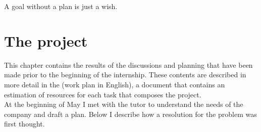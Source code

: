 \begin{savequote}[75mm]
	A goal without a plan is just a wish.
\end{savequote}

\chapter{The project}
\label{chapter_2}



This chapter contains the results of the discussions and planning that have been made prior to the beginning of the internship.
These contents are described in more detail in the  (work plan in English), a document that contains an estimation of resources for each task that composes the project.\\
At the beginning of May I met with the tutor to understand the needs of the company and draft a plan.
Below I describe how a resolution for the problem was first thought.

